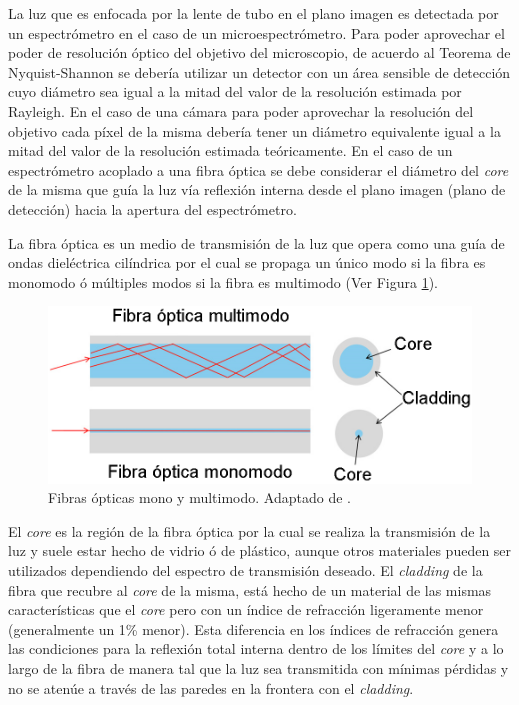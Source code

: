 La luz que es enfocada por la lente de tubo en el plano imagen es detectada por un espectrómetro en el caso de un microespectrómetro. Para poder aprovechar el poder de resolución óptico del objetivo del microscopio, de acuerdo al Teorema de Nyquist-Shannon se debería utilizar un detector con un área sensible de detección cuyo diámetro sea igual a la mitad del valor de la resolución estimada por Rayleigh. En el caso de una cámara para poder aprovechar la resolución del objetivo cada píxel de la misma debería tener un diámetro equivalente igual a la mitad del valor de la resolución estimada teóricamente. En el caso de un espectrómetro acoplado a una fibra óptica se debe considerar el diámetro del \textit{core} de la misma que guía la luz vía reflexión interna desde el plano imagen (plano de detección) hacia la apertura del espectrómetro.

La fibra óptica es un medio de transmisión de la luz que opera como una guía de ondas dieléctrica cilíndrica por el cual se propaga un único modo si la fibra es monomodo ó múltiples modos si la fibra es multimodo (Ver Figura \ref{fig:guiasmon}). 
\begin{figure}[H]
	\centering
	\includegraphics[width=1.0\textwidth]{Figs/introduccion/guias.png}
	\caption{Fibras ópticas mono y multimodo. Adaptado de \cite{dintek}.}
	\label{fig:guiasmon}
\end{figure}
El \textit{core} es la región de la fibra óptica por la cual se realiza la transmisión de la luz y suele estar hecho de vidrio ó de plástico, aunque otros materiales pueden ser utilizados dependiendo del espectro de transmisión deseado. El \textit{cladding} de la fibra que recubre al \textit{core} de la misma, está hecho de un material de las mismas características que el \textit{core} pero con un índice de refracción ligeramente menor (generalmente un 1\% menor)\cite{hecht2012optics}. Esta diferencia en los índices de refracción genera las condiciones para la reflexión total interna dentro de los límites del \textit{core} y a lo largo de la fibra de manera tal que la luz sea transmitida con mínimas pérdidas y no se atenúe a través de las paredes en la frontera con el \textit{cladding}. 

